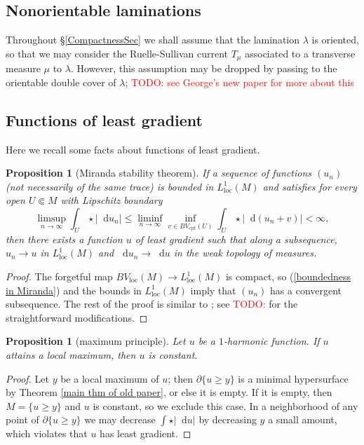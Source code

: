 \documentclass[reqno,11pt]{amsart}
\newcommand*\dif{\mathop{}\!\mathrm{d}}
\newcommand{\loc}{\mathrm{loc}}
\newcommand{\cpt}{\mathrm{cpt}}
\newtheorem{proposition}[theorem]{Proposition}
\theoremstyle{definition}
\numberwithin{equation}{section}
\newcommand\todo[1]{\textcolor{red}{TODO: #1}}
\begin{document}
\subsection{Nonorientable laminations}\label{nonorientable section}
Throughout \S\ref{CompactnessSec} we shall assume that the lamination $\lambda$ is oriented, so that we may consider the Ruelle-Sullivan current $T_\mu$ associated to a transverse measure $\mu$ to $\lambda$.
However, this assumption may be dropped by passing to the orientable double cover of $\lambda$; \todo{see George's new paper for more about this}

\subsection{Functions of least gradient}
Here we recall some facts about functions of least gradient.

\begin{proposition}[Miranda stability theorem]
	If a sequence of functions $(u_n)$ (not necessarily of the same trace) is bounded in $L^1_\loc(M)$ and satisfies for every open $U \Subset M$ with Lipschitz boundary
\begin{equation}\label{boundedness in Miranda}
	\limsup_{n \to \infty} \int_U \star |\dif u_n| \leq \liminf_{n \to \infty} \inf_{v \in BV_\cpt(U)} \int_U \star |\dif(u_n + v)| < \infty,
\end{equation}
	then there exists a function $u$ of least gradient such that along a subsequence, $u_n \to u$ in $L^1_\loc(M)$ and $\dif u_n \to \dif u$ in the weak topology of measures.
\end{proposition}
\begin{proof}
The forgetful map $BV_\loc(M) \to L^1_\loc(M)$ is compact, so (\ref{boundedness in Miranda}) and the bounds in $L^1_\loc(M)$ imply that $(u_n)$ has a convergent subsequence.
The rest of the proof is similar to \cite[Teorema 3 and Osservazione 3]{Miranda67}; see \todo{\cite{BackusFLG}} for the straightforward modifications.
\end{proof}

\begin{proposition}[maximum principle]\label{max princip}
Let $u$ be a $1$-harmonic function.
If $u$ attains a local maximum, then $u$ is constant.
\end{proposition}
\begin{proof}
Let $y$ be a local maximum of $u$; then $\partial \{u \geq y\}$ is a minimal hypersurface by Theorem \ref{main thm of old paper}, or else it is empty. If it is empty, then $M = \{u \geq y\}$ and $u$ is constant, so we exclude this case.
In a neighborhood of any point of $\partial \{u \geq y\}$ we may decrease $\int \star |\dif u|$ by decreasing $y$ a small amount, which violates that $u$ has least gradient.
\end{proof}
\end{document}
